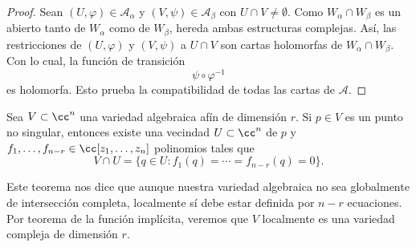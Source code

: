 \begin{proof}
	Sean $(U,\varphi)\in \mathcal{A}_\alpha$ y $(V,\psi)\in \mathcal{A}_\beta$ con $U\cap V\neq \emptyset$. Como $W_\alpha\cap W_\beta$ es un abierto tanto de $W_\alpha$ como de $W_\beta$, hereda ambas estructuras complejas. Así, las restricciones de $(U,\varphi)$ y $(V,\psi)$ a $U\cap V$ son cartas holomorfas de $W_\alpha\cap W_\beta$. Con lo cual, la función de transición
	\begin{equation*}
		\psi\circ\varphi^{-1}
	\end{equation*} 
	es holomorfa. Esto prueba la compatibilidad de todas las cartas de $\mathcal{A}$.
    \end{proof}
    
   	\begin{theorem}\parencite[Teo. 3.37]{carlosga}\label{teocarlos}
   		Sea $V\subset\cc^n$ una variedad algebraica afín de dimensión $r$. Si $p\in V$ es un punto no singular, entonces existe una vecindad $U\subset \cc^n$ de $p$ y $f_1,\dots,f_{n-r}\in\cc[z_1,\dots,z_n]$ polinomios tales que 
   		\begin{equation*}
   			V\cap U=\{q\in U:f_1(q)=\cdots=f_{n-r}(q)=0\}.
   		\end{equation*}
   	\end{theorem}
   	
   	Este teorema nos dice que aunque nuestra variedad algebraica no sea globalmente de intersección completa, localmente sí debe estar definida por $n-r$ ecuaciones. Por teorema de la función implícita, veremos que $V$ localmente es una variedad compleja de dimensión $r$.
   	
